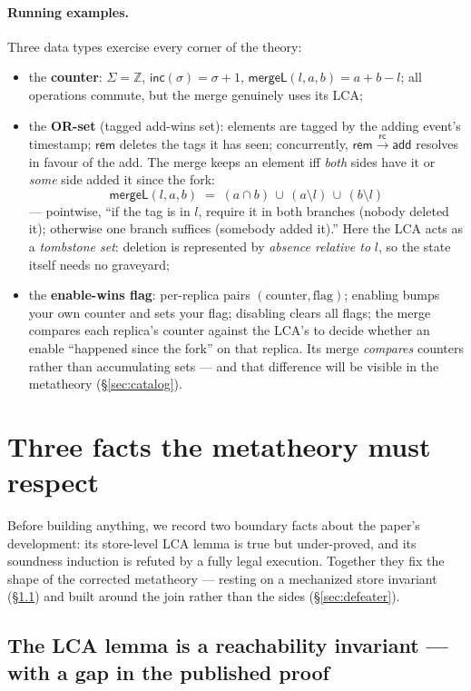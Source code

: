 \documentclass[11pt]{article}
\newcommand{\rc}{\xrightarrow{\mathsf{rc}}}
\newcommand{\add}{\mathsf{add}}
\newcommand{\rem}{\mathsf{rem}}
\newcommand{\mergeL}{\mathsf{mergeL}}
\begin{document}
\paragraph{Running examples.} Three data types exercise every corner of
the theory:
\begin{itemize}[leftmargin=2em]
\item the \textbf{counter}: $\Sigma = \mathbb{Z}$,
  $\mathsf{inc}(\sigma) = \sigma+1$, $\mergeL(l,a,b) = a+b-l$; all
  operations commute, but the merge genuinely uses its LCA;
\item the \textbf{OR-set} (tagged add-wins set): elements are tagged by
  the adding event's timestamp; $\rem$ deletes the tags it has seen;
  concurrently, $\rem \rc \add$ resolves in favour of the add. The merge
  keeps an element iff \emph{both} sides have it or \emph{some} side added
  it since the fork:
  \[
    \mergeL(l,a,b) \;=\; (a \cap b) \,\cup\, (a \setminus l) \,\cup\, (b
    \setminus l)
  \]
  --- pointwise, ``if the tag is in $l$, require it in both branches
  (nobody deleted it); otherwise one branch suffices (somebody added
  it).'' Here the LCA acts as a \emph{tombstone set}: deletion is
  represented by \emph{absence relative to} $l$, so the state itself needs
  no graveyard;
\item the \textbf{enable-wins flag}: per-replica pairs
  $(\text{counter},\text{flag})$; enabling bumps your own counter and sets
  your flag; disabling clears all flags; the merge compares each
  replica's counter against the LCA's to decide whether an enable
  ``happened since the fork'' on that replica. Its merge \emph{compares}
  counters rather than accumulating sets --- and that difference will be
  visible in the metatheory (\S\ref{sec:catalog}).
\end{itemize}

\section{Three facts the metatheory must respect}

Before building anything, we record two boundary facts about the
paper's development: its store-level LCA lemma is true but under-proved,
and its soundness induction is refuted by a fully legal execution.
Together they fix the shape of the corrected metatheory --- resting on a
mechanized store invariant (\S\ref{sec:lca}) and built around the join
rather than the sides (\S\ref{sec:defeater}).

\subsection{The LCA lemma is a reachability invariant --- with a gap in the
published proof}
\label{sec:lca}
\end{document}
